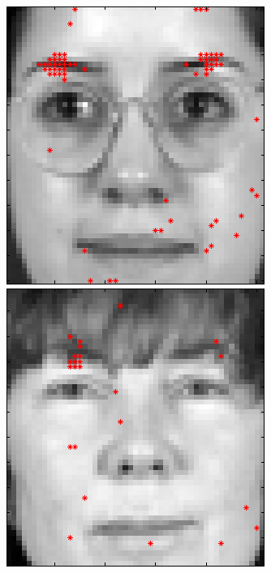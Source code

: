 \begin{figure}[ht]
 \includegraphics[width=\textwidth*11/100]{ch5/figures/XM2VTS_6_-1.png}
 \includegraphics[width=\textwidth*11/100]{ch5/figures/XM2VTS_7_-1.png}

\end{figure}

